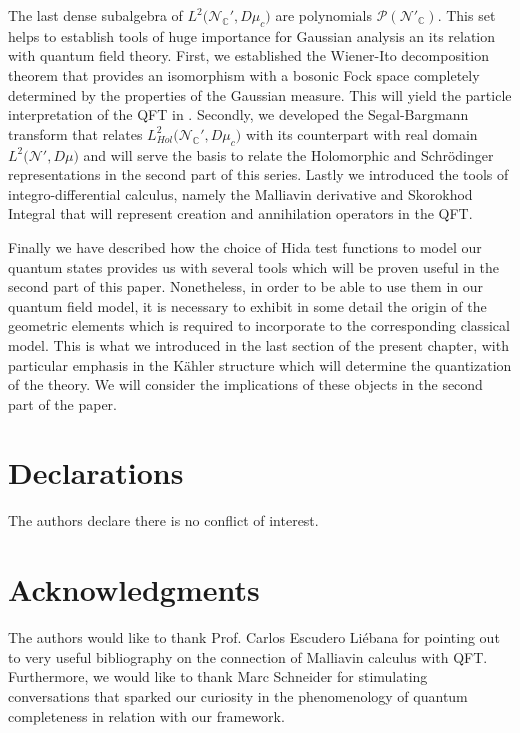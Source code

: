 \documentclass{elsarticle}%
\begin{document}
 The last  dense subalgebra of $L^2\big({\mathcal{N}_{\mathbb{C}}'}, D\mu_c\big)$ are polynomials  $\mathcal{P}(\mathcal{N}'_\mathbb{C})$. This set helps to establish tools of huge importance for Gaussian analysis an its relation with quantum field theory. First, we established the Wiener-Ito decomposition theorem that provides an isomorphism with a bosonic Fock space completely determined by the properties of the Gaussian measure. This will yield the particle interpretation of the QFT in \cite{alonsoGeometricFlavours2024}. Secondly, we developed the Segal-Bargmann transform that relates $L^2_{Hol}\big({\mathcal{N}_{\mathbb{C}}'}, D\mu_c\big)$ with its counterpart with real domain $L^2\big({\mathcal{N}'}, D\mu\big)$ and will serve the basis to relate the Holomorphic and Schrödinger representations in the second part of this series. Lastly we introduced the tools of integro-differential calculus, namely the Malliavin derivative and Skorokhod Integral that will represent creation and annihilation operators in the QFT.  



 Finally we have described how the choice of Hida test functions to model our quantum states provides us with several tools which will be proven useful in the second part of this paper. Nonetheless, in order to be able to use them in our quantum field model, it is necessary to exhibit in some detail the origin of the geometric elements which is required to incorporate to the corresponding classical model. This is what we introduced in the last section of the present chapter, with particular emphasis in the Kähler structure which will determine the quantization of the theory. We will consider the implications of these objects in the second part of the paper.



 \section{Declarations}

 The authors  declare there is no conflict of interest. 

\section{Acknowledgments}
The authors would like to thank  Prof. Carlos Escudero Liébana for pointing out to very useful bibliography on the connection of Malliavin calculus with QFT. Furthermore, we would like to thank Marc Schneider for stimulating conversations that sparked our curiosity in the phenomenology of quantum completeness in relation with our framework.
\end{document}
